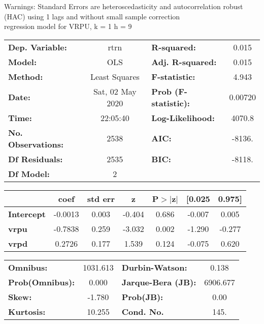 Warnings: \newline
 [1] Standard Errors are heteroscedasticity and autocorrelation robust (HAC) using 1 lags and without small sample correction\\ 

regression model for VRPU, k = 1 h = 9\begin{center}
\begin{tabular}{lclc}
\toprule
\textbf{Dep. Variable:}    &       rtrn       & \textbf{  R-squared:         } &     0.015   \\
\textbf{Model:}            &       OLS        & \textbf{  Adj. R-squared:    } &     0.015   \\
\textbf{Method:}           &  Least Squares   & \textbf{  F-statistic:       } &     4.943   \\
\textbf{Date:}             & Sat, 02 May 2020 & \textbf{  Prob (F-statistic):} &  0.00720    \\
\textbf{Time:}             &     22:05:40     & \textbf{  Log-Likelihood:    } &    4070.8   \\
\textbf{No. Observations:} &        2538      & \textbf{  AIC:               } &    -8136.   \\
\textbf{Df Residuals:}     &        2535      & \textbf{  BIC:               } &    -8118.   \\
\textbf{Df Model:}         &           2      & \textbf{                     } &             \\
\bottomrule
\end{tabular}
\begin{tabular}{lcccccc}
                   & \textbf{coef} & \textbf{std err} & \textbf{z} & \textbf{P$> |$z$|$} & \textbf{[0.025} & \textbf{0.975]}  \\
\midrule
\textbf{Intercept} &      -0.0013  &        0.003     &    -0.404  &         0.686        &       -0.007    &        0.005     \\
\textbf{vrpu}      &      -0.7838  &        0.259     &    -3.032  &         0.002        &       -1.290    &       -0.277     \\
\textbf{vrpd}      &       0.2726  &        0.177     &     1.539  &         0.124        &       -0.075    &        0.620     \\
\bottomrule
\end{tabular}
\begin{tabular}{lclc}
\textbf{Omnibus:}       & 1031.613 & \textbf{  Durbin-Watson:     } &    0.138  \\
\textbf{Prob(Omnibus):} &   0.000  & \textbf{  Jarque-Bera (JB):  } & 6906.677  \\
\textbf{Skew:}          &  -1.780  & \textbf{  Prob(JB):          } &     0.00  \\
\textbf{Kurtosis:}      &  10.255  & \textbf{  Cond. No.          } &     145.  \\
\bottomrule
\end{tabular}
\end{center}

